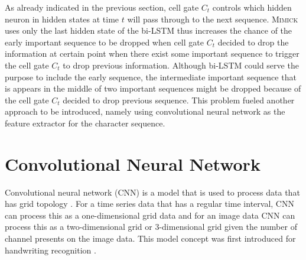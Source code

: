     As already indicated in the previous section, cell gate $C_t$
    controls which hidden neuron in hidden states at time $t$ will
    pass through to the next sequence. \textsc{Mimick} uses only the
    last hidden state of the bi-LSTM thus increases the chance of the
    early important sequence to be dropped when cell gate $C_t$
    decided to drop the information at certain point when there exist
    some important sequence to trigger the cell gate $C_t$ to drop
    previous information. Although bi-LSTM could serve the purpose to
    include the early sequence, the intermediate important sequence
    that is appears in the middle of two important sequences might be
    dropped because of the cell gate $C_t$ decided to drop previous
    sequence. This problem fueled another approach to be introduced,
    namely using convolutional neural network as the feature extractor
    for the character sequence.

\section{Convolutional Neural Network}
    Convolutional neural network (CNN) is a model that is used to
    process data that has grid topology \citep{Goodfellow-et-al-2016}.
    For a time series data that has a regular time interval, CNN can
    process this as a one-dimensional grid data and for an image data
    CNN can process this as a two-dimensional grid or 3-dimensional
    grid given the number of channel presents on the image data. This
    model concept was first introduced for handwriting recognition
    \citep{generalization1989lecun}.

